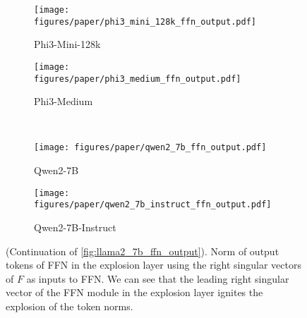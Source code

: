 \begin{figure*}[!t]
\begin{subfigure}[t]{0.49\textwidth}
        \texttt{[image: figures/paper/phi3\_mini\_128k\_ffn\_output.pdf]}
        \caption{Phi3-Mini-128k}\label{fig:phi3_mini_128k_ffn_output}
    \end{subfigure}
    \begin{subfigure}[t]{0.49\textwidth}
        \texttt{[image: figures/paper/phi3\_medium\_ffn\_output.pdf]}
        \caption{Phi3-Medium}\label{fig:phi3_medium_ffn_output}
    \end{subfigure}\\
    \begin{subfigure}[t]{0.49\textwidth}
        \texttt{[image: figures/paper/qwen2\_7b\_ffn\_output.pdf]}
        \caption{Qwen2-7B}\label{fig:qwen2_7b_ffn_output}
    \end{subfigure}
    \begin{subfigure}[t]{0.49\textwidth}
        \texttt{[image: figures/paper/qwen2\_7b\_instruct\_ffn\_output.pdf]}
        \caption{Qwen2-7B-Instruct}\label{fig:qwen2_7b_instruct_ffn_output}
    \end{subfigure}
    \caption{(Continuation of \cref{fig:llama2_7b_ffn_output}).
    Norm of output tokens of FFN in the explosion layer using the right singular vectors of \(F\) as inputs to FFN.
    We can see that the leading right singular vector of the FFN module in the explosion layer ignites the explosion of the token norms.
    }\label{fig:more_llm_ffn_output}
\end{figure*}



